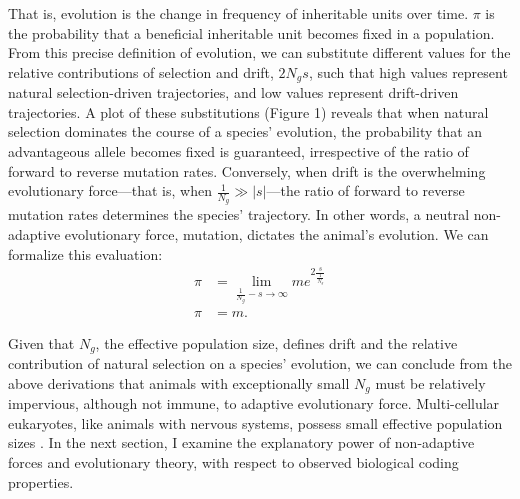 \documentclass{article}
\begin{document}
That is, evolution is the change in frequency of inheritable units over time. $\pi$ is the probability that a beneficial inheritable unit becomes fixed in a population. From this precise definition of evolution, we can substitute different values for the relative contributions of selection and drift, $2N_g s$, such that high values represent natural selection-driven trajectories, and low values represent drift-driven trajectories. A plot of these substitutions (Figure 1) reveals that when natural selection dominates the course of a species' evolution, the probability that an advantageous allele becomes fixed is guaranteed, irrespective of the ratio of forward to reverse mutation rates. Conversely, when drift is the overwhelming evolutionary force---that is, when $\frac{1}{N_g} \gg |s|$---the ratio of forward to reverse mutation rates determines the species' trajectory. In other words, a neutral non-adaptive evolutionary force, mutation, dictates the animal's evolution. We can formalize this evaluation:
\begingroup
\large
\begin{equation}
\begin{split}
    \pi & = \lim_{\frac{1}{N_g} - s \to \infty} m e^{2 \frac{s}{\frac{1}{N_g}}} \\
    \pi & = m.
\end{split}
\end{equation}
\endgroup

Given that $N_g$, the effective population size, defines drift and the relative contribution of natural selection on a species' evolution, we can conclude from the above derivations that animals with exceptionally small $N_g$ must be relatively impervious, although not immune, to adaptive evolutionary force. Multi-cellular eukaryotes, like animals with nervous systems, possess small effective population sizes \cite{Lynch_Conery_2003}. In the next section, I examine the explanatory power of non-adaptive forces and evolutionary theory, with respect to observed biological coding properties. 
\end{document}
